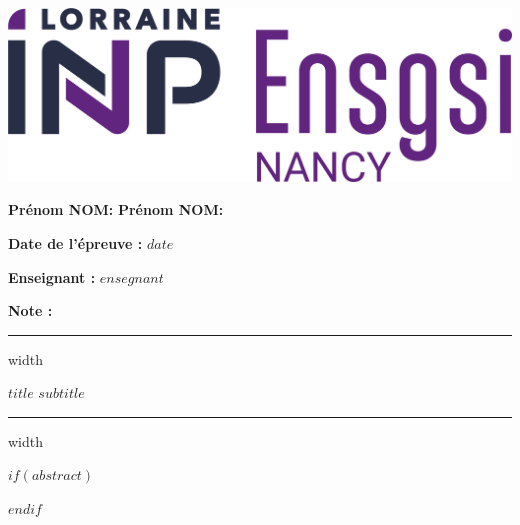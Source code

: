 
\begin{minipage}{.3\textwidth}
    \flushleft
    \includegraphics[scale=.27]{figures/ENSGSI.png}
\end{minipage}
    \hfill
\begin{minipage}{.64\textwidth}   
    \bigskip
    
    \textbf{\textcolor{gsi_violet}{Prénom NOM:}} \dotfill \newline   
    \textbf{\textcolor{gsi_violet}{Prénom NOM:}} \dotfill    
    
    \bigskip
    
    \textbf{\textcolor{gsi_violet}{Date de l'épreuve :}} $date$
\end{minipage}   

\bigskip

\begin{minipage}{.7\textwidth}
    \flushleft
    \textbf{\textcolor{gsi_violet}{Enseignant :}} $ensegnant$
\end{minipage}
    \hfill
\begin{minipage}{.29\textwidth}
    \flushleft
    \textbf{\textcolor{gsi_violet}{Note :}}
\end{minipage}
  
    
\bigskip

\hrule height .1pt depth .2pt width \textwidth

\bigskip

\begin{center}
\textbf{\sffamily\Large $title$} \newline
\textbf{\sffamily\normalsize $subtitle$}
\end{center}

\bigskip
\hrule height .1pt depth .2pt width \textwidth

\bigskip

$if(abstract)$
\begin{abstract}
$abstract$
\end{abstract}
$endif$

